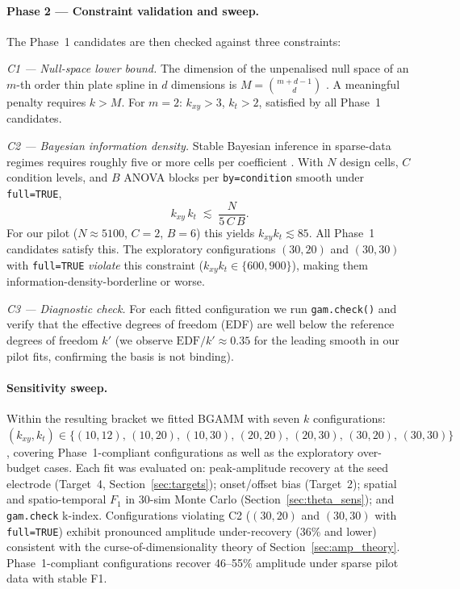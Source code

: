\documentclass[12pt, a4paper]{article}
\begin{document}
\paragraph{Phase 2 — Constraint validation and sweep.}
The Phase~1 candidates are then checked against three constraints:

\textit{C1 --- Null-space lower bound.} The dimension of the unpenalised
null space of an $m$-th order thin plate spline in $d$ dimensions is
$M = \binom{m+d-1}{d}$ \citep[\S 5.5]{Wood2017}. A meaningful penalty
requires $k > M$. For $m=2$: $k_{xy} > 3$, $k_t > 2$, satisfied by all
Phase~1 candidates.

\textit{C2 --- Bayesian information density.} Stable Bayesian inference
in sparse-data regimes requires roughly five or more cells per
coefficient \citep[informal rule discussed in][]{Gelman2006}. With
$N$ design cells, $C$ condition levels, and $B$ ANOVA blocks per
\texttt{by=condition} smooth under \texttt{full=TRUE},
\[
   k_{xy}\,k_t \;\lesssim\; \frac{N}{5\,C\,B}.
\]
For our pilot ($N \approx 5100$, $C=2$, $B=6$) this yields
$k_{xy} k_t \lesssim 85$. All Phase~1 candidates satisfy this. The
exploratory configurations $(30, 20)$ and $(30, 30)$ with
\texttt{full=TRUE} \emph{violate} this constraint
($k_{xy} k_t \in \{600, 900\}$), making them
information-density-borderline or worse.

\textit{C3 --- Diagnostic check.} For each fitted configuration we run
\texttt{gam.check()} \citep[\S 5.9.2]{Wood2017} and verify that the
effective degrees of freedom (EDF) are well below the reference
degrees of freedom $k'$ (we observe $\mathrm{EDF}/k' \approx 0.35$ for
the leading smooth in our pilot fits, confirming the basis is not
binding).

\paragraph{Sensitivity sweep.}
Within the resulting bracket we fitted BGAMM with seven $k$
configurations:
$(k_{xy}, k_t) \in \{(10, 12),\, (10, 20),\, (10, 30),\,
(20, 20),\, (20, 30),\, (30, 20),\, (30, 30)\}$,
covering Phase~1-compliant configurations as well as the
exploratory over-budget cases. Each fit was evaluated on:
peak-amplitude recovery at the seed electrode (Target~4,
Section~\ref{sec:targets}); onset/offset bias (Target~2);
spatial and spatio-temporal $F_1$ in 30-sim Monte Carlo
(Section~\ref{sec:theta_sens}); and \texttt{gam.check} k-index.
Configurations violating C2 ($(30, 20)$ and $(30, 30)$ with
\texttt{full=TRUE}) exhibit pronounced amplitude under-recovery
(36\% and lower) consistent with the curse-of-dimensionality theory
of Section~\ref{sec:amp_theory}. Phase~1-compliant configurations
recover 46--55\% amplitude under sparse pilot data with stable F1.
\end{document}
